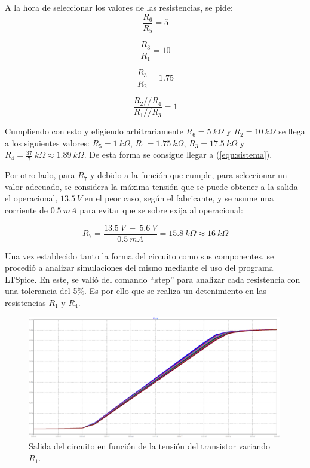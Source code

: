 \documentclass[a4paper]{article}
\begin{document}
A la hora de seleccionar los valores de las resistencias, se pide:
\[
	\frac{R_6}{R_5} = 5
\]

\[
	\frac{R_3}{R_1} = 10
\]

\[
	\frac{R_3}{R_2} = 1.75
\]

\[
	\frac{R_2 // R_4}{R_1 // R_3} = 1
\]

Cumpliendo con esto y eligiendo arbitrariamente $R_6 = 5 \ k\Omega$ y $R_2 = 10 \ k\Omega$ se llega a los siguientes valores: $R_5 = 1 \ k\Omega$, $R_1 = 1.75 \ k\Omega$, $R_3 = 17.5 \ k\Omega$ y $R_4 = \frac{37}{7} \ k\Omega \approx 1.89 \ k\Omega$. De esta forma se consigue llegar a (\ref{equ:sistema}).

Por otro lado, para $R_7$ y debido a la función que cumple, para seleccionar un valor adecuado, se considera la máxima tensión que se puede obtener a la salida el operacional, $13.5 \ V$ en el peor caso, según el fabricante, y se asume una corriente de $0.5 \ mA$ para evitar que se sobre exija al operacional:

\begin{equation}
	R_7 = \frac{13.5 \ V \ - \ 5.6 \ V}{0.5 \ mA} = 15.8 \ k\Omega \approx 16 \ k\Omega
	\label{equ:rzener}
\end{equation}

Una vez establecido tanto la forma del circuito como sus componentes, se procedió a analizar simulaciones del mismo mediante el uso del programa LTSpice. En este, se valió del comando ``.step'' para analizar cada resistencia con una tolerancia del 5\%. Es por ello que se realiza un detenimiento en las resistencias $R_1$ y $R_4$.

\begin{figure}[H]
	\centering
	\includegraphics[width=0.99\textwidth]{Ejercicio6/Imagenes/StepR1-M1.png}
	\caption{Salida del circuito en función de la tensión del transistor variando $R_1$.}
	\label{fig:r1-M1}
\end{figure}
\end{document}
